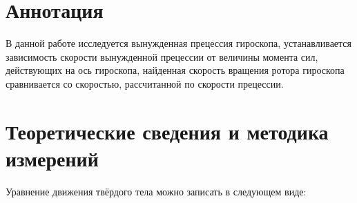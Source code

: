 \section{Аннотация}

    В данной работе исследуется вынужденная прецессия гироскопа, устанавливается зависимость скорости вынужденной прецессии от величины момента сил, действующих на ось гироскопа, найденная скорость вращения ротора гироскопа сравнивается со скоростью, рассчитанной по скорости прецессии.






\section{Теоретические сведения и методика измерений}



    Уравнение движения твёрдого тела можно записать в следующем виде:

